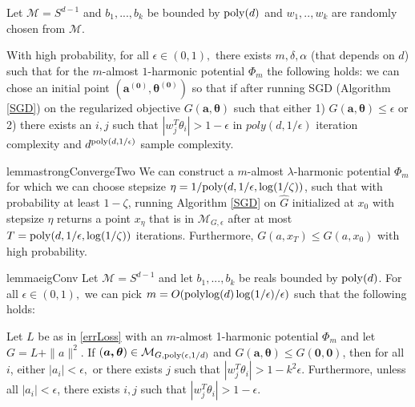 %
\begin{theorem}\label{eigSGD}
  Let $\mathcal{M} = S^{d-1}$ and $b_1,...,b_k$ be bounded by $\mathrm{poly}(d)$ and $w_1,..,w_k$ are randomly chosen from $\mathcal{M}$.  

  With high probability, for all $\epsilon \in (0,1),$ there exists $m, \delta, \alpha$ (that depends on $d$) such that for the $m$-almost $1$-harmonic potential $\Phi_m$ the
  following holds: we can chose an initial point $(\boldsymbol{a^{(0)}, \theta^{(0)}})$ so that if after running SGD (Algorithm \ref{SGD}) on the regularized objective
  $G(\boldsymbol{a,\theta})$ such that either 1) $G(\boldsymbol{a,\theta}) \leq \epsilon$ or 2) there exists an $i, j$ such that $|w_j^T\theta_i| > 1- \epsilon$ in $poly(d,1/\epsilon)$ iteration complexity and $d^{\mathrm{poly}(d, 1/\epsilon)}$ sample complexity.
\end{theorem}
%
%
%
%
\begin{restatable}{lemma}{strongConvergeTwo}\label{strongConvergeTwo}  
We can construct a $m$-almost $\lambda$-harmonic potential $\Phi_m$ for which
we can choose stepsize $\eta = 1/\mathrm{poly}(d,1/\epsilon,\log(1/\zeta))$, such that with probability at least $1-\zeta$, running Algorithm \ref{SGD} on $\widehat{G}$ initialized at $x_0$ with stepsize $\eta$  returns a point $x_\eta$ that is in $\mathcal{M}_{G, \epsilon}$ after at most $T = \mathrm{poly}(d,1/\epsilon, \log(1/\zeta))$ iterations. 
 Furthermore, $G(a,x_T) \leq G(a, x_0)$ with high probability. 
\end{restatable}
%
\begin{restatable}{lemma}{eigConv}
\label{eigConv}
Let $\mathcal{M} = S^{d-1}$ and let $b_1,...,b_k$ be reals bounded by
$\mathrm{poly}(d)$. For all $\epsilon \in (0,1),$ we can pick
$m = O(\mathop\mathrm{polylog}\nolimits(d)\log(1/\epsilon)/\epsilon)$ such that the following holds:

Let $L$ be as in \eqref{errLoss} with an $m$-almost 1-harmonic
potential $\Phi_m$ and let $G = L + \|a\|^2$.  If
$(\boldsymbol{a,\theta}) \in \mathcal{M}_{G, \mathrm{poly}(\epsilon,1/d)}$ and
$G(\boldsymbol{a,\theta}) \leq G(\boldsymbol{0, 0})$, then for all
$i$, either $|a_i| < \epsilon,$ or there exists $j$ such that
$|w_j^T\theta_i| > 1- k^2\epsilon.$ Furthermore,
unless all $|a_i| <\epsilon$, there exists $i, j$ such that
$|w_j^T\theta_i| > 1-\epsilon$.
\end{restatable}
%
